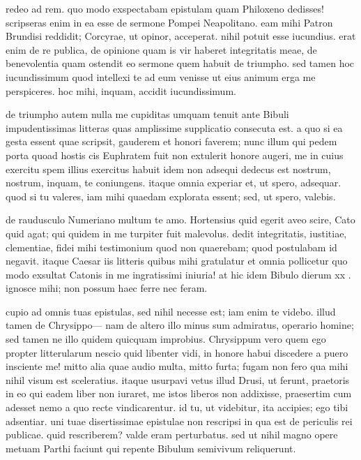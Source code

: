  redeo ad rem. quo modo exspectabam epistulam quam Philoxeno dedisses! scripseras enim in ea esse de sermone Pompei Neapolitano. eam mihi Patron Brundisi reddidit; Corcyrae, ut opinor, acceperat. nihil potuit esse iucundius. erat enim de re publica, de opinione quam is vir haberet integritatis meae, de benevolentia quam ostendit eo sermone quem habuit de triumpho. sed tamen hoc iucundissimum quod intellexi te ad eum venisse ut eius animum erga me perspiceres. hoc mihi, inquam, accidit iucundissimum.

 de triumpho autem nulla me cupiditas umquam tenuit ante Bibuli impudentissimas litteras quas amplissime supplicatio consecuta est. a quo si ea gesta essent quae scripsit, gauderem et honori faverem; nunc illum qui pedem porta quoad hostis cis Euphratem fuit non extulerit honore augeri, me in cuius exercitu spem illius exercitus habuit idem non adsequi dedecus est nostrum, nostrum, inquam, te coniungens. itaque omnia experiar et, ut spero, adsequar. quod si tu valeres, iam mihi quaedam explorata essent; sed, ut spero, valebis.

 de raudusculo Numeriano multum te amo. Hortensius quid egerit aveo scire, Cato quid agat; qui quidem in me turpiter fuit malevolus. dedit integritatis, iustitiae, clementiae, fidei mihi testimonium quod non quaerebam; quod postulabam id negavit. itaque Caesar iis litteris quibus mihi gratulatur et omnia pollicetur quo modo exsultat Catonis in me ingratissimi iniuria! at hic idem Bibulo dierum xx . ignosce mihi; non possum haec ferre nec feram.

 cupio ad omnis tuas epistulas, sed nihil necesse est; iam enim te videbo. illud tamen de Chrysippo— nam de altero illo minus sum admiratus, operario homine; sed tamen ne illo quidem quicquam improbius. Chrysippum vero quem ego propter litterularum nescio quid libenter vidi, in honore habui discedere a puero insciente me! mitto alia quae audio multa, mitto furta; fugam non fero qua mihi nihil visum est sceleratius. itaque usurpavi vetus illud Drusi, ut ferunt, praetoris in eo qui eadem liber non iuraret, me istos liberos non addixisse, praesertim cum adesset nemo a quo recte vindicarentur. id tu, ut videbitur, ita accipies; ego tibi adsentiar. uni tuae disertissimae epistulae non rescripsi in qua est de periculis rei publicae. quid rescriberem? valde eram perturbatus. sed ut nihil magno opere metuam Parthi faciunt qui repente Bibulum semivivum reliquerunt.
